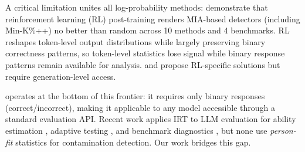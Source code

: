 A critical limitation unites all log-probability methods: \citet{wang2025fragility} demonstrate that reinforcement learning (RL) post-training renders MIA-based detectors (including Min-K\%++) no better than random across 10 methods and 4 benchmarks.
RL reshapes token-level output distributions while largely preserving binary correctness patterns, so token-level statistics lose signal while binary response patterns remain available for analysis.
\citet{selfcritique2026} and \citet{zhang2026rlvr} propose RL-specific solutions but require generation-level access.

\irtfit{} operates at the bottom of this frontier: it requires only binary responses (correct/incorrect), making it applicable to any model accessible through a standard evaluation API.
Recent work applies IRT to LLM evaluation for ability estimation \citep{martinezplumed2019, polo2024tinybenchmarks}, adaptive testing \citep{atlas2025}, and benchmark diagnostics \citep{psnirt2026}, but none use \emph{person-fit} statistics for contamination detection.
Our work bridges this gap.

